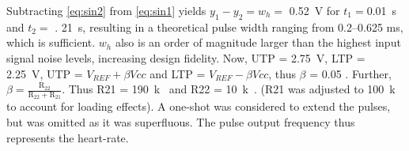 Subtracting \ref{eq:sin2} from \ref{eq:sin1} yields $y_1 - y_2 = w_h =$ \SI{0.52}{V} for $t_1 =$\SI{0.01}{s} and $t_2 =$ \SI{.
21}{s}, resulting in a theoretical pulse width ranging from \numrange{0.2}{0.625} \si{ms}, which is sufficient. $w_h$ also is an order of magnitude larger than the highest input signal noise levels, increasing design fidelity.  Now, UTP = \SI{2.75}{V}, LTP = \SI{2.25}{V}, UTP = $V_{REF} + \beta Vcc$ and LTP = $V_{REF} - \beta Vcc$, thus $\beta$ = 0.05 \cite{schmitt}. Further, $\beta=\frac{\mathrm{R}_{22}}{\mathrm{R}_{22}+\mathrm{R}_{21}}$. Thus R21 = \SI{190}{k\Omega} and R22 = \SI{10}{k\Omega}. (R21 was adjusted to \SI{100}{k\Omega} to account for loading effects). A one-shot was considered to extend the pulses, but was omitted as it was superfluous. The pulse output frequency thus represents the heart-rate.\\

